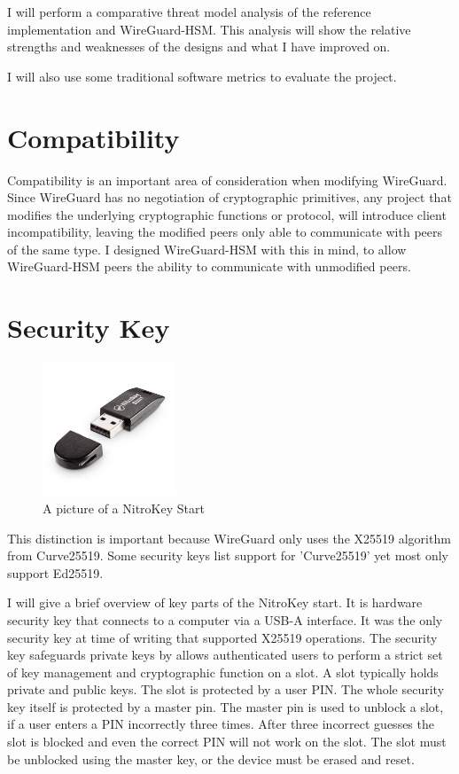 \documentclass [11pt, proquest] {uwthesis}[2020/02/24]
\begin{document}
I will perform a comparative threat model analysis of the reference implementation and WireGuard-HSM. This analysis will show the relative strengths and weaknesses of the designs and what I have improved on.

I will also use some traditional software metrics to evaluate the project.


\section{Compatibility}
Compatibility is an important area of consideration when modifying WireGuard. Since WireGuard has no negotiation of cryptographic primitives, any project that modifies the underlying cryptographic functions or protocol, will introduce client incompatibility, leaving the modified peers only able to communicate with peers of the same type. I designed WireGuard-HSM with this in mind, to allow WireGuard-HSM peers the ability to communicate with unmodified peers.

\section{Security Key}
\begin{figure}[ht]
\includegraphics[width=4cm]{paper/images/nitrokey.jpg}
\caption{A picture of a NitroKey Start}
\label{nitrokey}
\end{figure}

This distinction is important because WireGuard only uses the X25519 algorithm from Curve25519. Some security keys list support for 'Curve25519' yet most only support Ed25519.

I will give a brief overview of key parts of the NitroKey start. It is hardware security key that connects to a computer via a USB-A interface. It was the only security key at time of writing that supported X25519 operations.
The security key safeguards private keys by allows authenticated users to perform a strict set of key management and cryptographic function on a slot. A slot typically holds private and public keys. The slot is protected by a user PIN. The whole security key itself is protected by a master pin. The master pin is used to unblock a slot, if a user enters a PIN incorrectly three times. After three incorrect guesses the slot is blocked and even the correct PIN will not work on the slot. The slot must be unblocked using the master key, or the device must be erased and reset.
\end{document}
